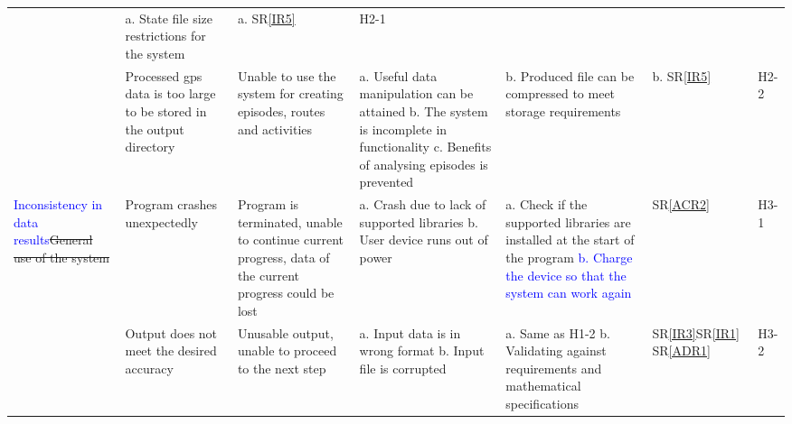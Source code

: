 \documentclass{article}
\begin{document}
\begin{landscape}
\begin{table}[H]
{\begin{tabular}{|p{1.8 in}|p{2.0 in}|p{2 in}|p{2 in}|p{2.3 in}|p{0.5 in}|p{0.5 in}|}
& a. State file size restrictions for the system \newline
& a. SR\ref{IR5} \newline 
& H2-1\\



& Processed gps data is too large to be stored in the output directory
& Unable to use the system for creating episodes, routes and activities
& a. Useful data manipulation can be attained\newline
  b. The system is incomplete in functionality\newline
  c. Benefits of analysing episodes is prevented \newline 
& b. Produced file can be compressed to meet storage requirements\newline
& b. SR\ref{IR5} \newline 
& H2-2 \\ \hline
 


\multirow{3}{1.8in}{\textcolor{blue}{Inconsistency in data results}\sout{General use of the system}} 
& Program crashes unexpectedly
& Program is terminated, unable to continue current progress, data of the
current progress could be lost
& 
a. Crash due to lack of supported libraries\newline
b. User device runs out of power\newline
& 
a. Check if the supported libraries are installed at the start of the program\newline
\textcolor{blue}{b. Charge the device so that the system can work again\newline}
& SR\ref{ACR2}%
& H3-1\label{H3-1} \\


& Output does not meet the desired accuracy
& Unusable output, unable to proceed to the next step
&
a. Input data is in wrong format
b. Input file is corrupted
& 
a. Same as H1-2 \newline
b. Validating against requirements and mathematical specifications\newline
& SR\ref{IR3}\newline SR\ref{IR1} \newline SR\ref{ADR1}
& H3-2\label{H3-2}  \\





\end{tabular}}
\end{table}
\end{landscape}
\end{document}

